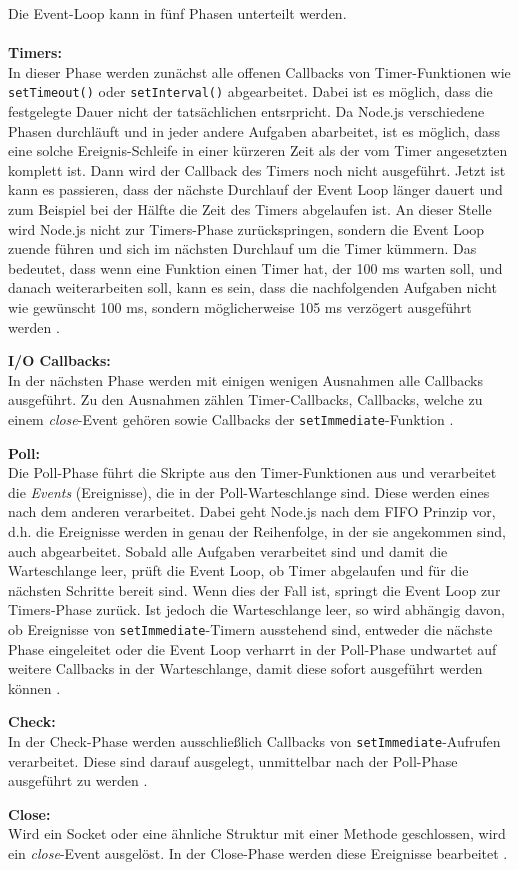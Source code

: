 Die Event-Loop kann in fünf Phasen unterteilt werden.\\ \\
\textbf{Timers:}\\
In dieser Phase werden zunächst alle offenen Callbacks von Timer-Funktionen wie \texttt{setTimeout()} oder \texttt{setInterval()} abgearbeitet. Dabei ist es möglich, dass die festgelegte Dauer nicht der tatsächlichen entsrpricht. Da Node.js verschiedene Phasen durchläuft und in jeder andere Aufgaben abarbeitet, ist es möglich, dass eine solche Ereignis-Schleife in einer kürzeren Zeit als der vom Timer angesetzten komplett ist. Dann wird der Callback des Timers noch nicht ausgeführt. Jetzt ist kann es passieren, dass der nächste Durchlauf der Event Loop länger dauert und zum Beispiel bei der Hälfte die Zeit des Timers abgelaufen ist. An dieser Stelle wird Node.js nicht zur Timers-Phase zurückspringen, sondern die Event Loop zuende führen und sich im nächsten Durchlauf um die Timer kümmern. Das bedeutet, dass wenn eine Funktion einen Timer hat, der 100 ms warten soll, und danach weiterarbeiten soll, kann es sein, dass die nachfolgenden Aufgaben nicht wie gewünscht 100 ms, sondern möglicherweise 105 ms verzögert ausgeführt werden \cite{njsel}.

\textbf{I/O Callbacks:}\\
In der nächsten Phase werden mit einigen wenigen Ausnahmen alle Callbacks ausgeführt. Zu den Ausnahmen zählen Timer-Callbacks, Callbacks, welche zu einem \textit{close}-Event gehören sowie Callbacks der \texttt{setImmediate}-Funktion \cite{njsel}.

\textbf{Poll:}\\
Die Poll-Phase führt die Skripte aus den Timer-Funktionen aus und verarbeitet die \textit{Events} (Ereignisse), die in der Poll-Warteschlange sind. Diese werden eines nach dem anderen verarbeitet. Dabei geht Node.js nach dem \ac{FIFO} Prinzip vor, d.h. die Ereignisse werden in genau der Reihenfolge, in der sie angekommen sind, auch abgearbeitet. Sobald alle Aufgaben verarbeitet sind und damit die Warteschlange leer, prüft die Event Loop, ob Timer abgelaufen und für die nächsten Schritte bereit sind. Wenn dies der Fall ist, springt die Event Loop zur Timers-Phase zurück. Ist jedoch die Warteschlange leer, so wird abhängig davon, ob Ereignisse von \texttt{setImmediate}-Timern ausstehend sind, entweder die nächste Phase eingeleitet oder die Event Loop verharrt in der Poll-Phase undwartet auf weitere Callbacks in der Warteschlange, damit diese sofort ausgeführt werden können \cite{njsel}.

\textbf{Check:}\\
In der Check-Phase werden ausschließlich Callbacks von \texttt{setImmediate}-Aufrufen verarbeitet. Diese sind darauf ausgelegt, unmittelbar nach der Poll-Phase ausgeführt zu werden \cite{njsel}.

\textbf{Close:}\\
Wird ein Socket oder eine ähnliche Struktur mit einer Methode geschlossen, wird ein \textit{close}-Event ausgelöst. In der Close-Phase werden diese Ereignisse bearbeitet \cite{njsel}.




